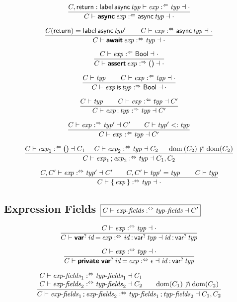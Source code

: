 $$
\frac{
  C, \K{return} : \K{label} \, \K{async} \x{typ} \vdash \x{exp} \anal \x{typ} \dashv \cdot
}{
  C \vdash \KK{async} \x{exp} \anal \K{async} \x{typ} \dashv \cdot
}
$$

$$
\frac{
  C(\K{return}) = \K{label} \, \K{async} \x{typ}'
  \qquad
  C \vdash \x{exp} \analsynth \K{async} \x{typ} \dashv \cdot
}{
  C \vdash \KK{await} \x{exp} \analsynth \x{typ} \dashv \cdot
}
$$

$$
\frac{
  C \vdash \x{exp} \anal \K{Bool} \dashv \cdot
}{
  C \vdash \KK{assert} \x{exp} \synth \K{()} \dashv \cdot
}
$$

$$
\frac{
  C \vdash \x{typ}
  \qquad
  C \vdash \x{exp} \anal \x{typ} \dashv \cdot
}{
  C \vdash \x{exp} \K{is} \x{typ} \synth \K{Bool} \dashv \cdot
}
$$

$$
\frac{
  C \vdash \x{typ}
  \qquad
  C \vdash \x{exp} \anal \x{typ} \dashv C'
}{
  C \vdash \x{exp} \K: \x{typ} \synth \x{typ} \dashv C'
}
$$

$$
\frac{
  C \vdash \x{exp} \synth \x{typ}' \dashv C'
  \qquad
  C \vdash \x{typ}' <: \x{typ}
}{
  C \vdash \x{exp} \anal \x{typ} \dashv C'
}
$$

$$
\frac{
  C \vdash \x{exp}_1 \anal \K{()} \dashv C_1
  \quad~
  C \vdash \x{exp}_2 \analsynth \x{typ} \dashv C_2
  \quad~
  \Dom(C_2) \setdisj \Dom(C_2)
}{
  C \vdash \x{exp}_1 \K; \x{exp}_2 \analsynth \x{typ} \dashv C_1, C_2
}
$$

$$
\frac{
  C, C' \vdash \x{exp} \analsynth \x{typ}' \dashv C'
  \qquad
  C, C' \vdash \x{typ}' = \x{typ}
  \qquad
  C \vdash \x{typ}
}{
  C \vdash \K\{ \x{exp} \K\} \analsynth \x{typ} \dashv \cdot
}
$$


\subsection*{Expression Fields \hfill $\boxed{C \vdash \x{exp-fields} \analsynth \x{typ-fields} \dashv C'}$}

$$
\frac{
  C \vdash \x{exp} \analsynth \x{typ} \dashv \cdot
}{
  C \vdash \KK{var}^? \x{id} \K= \x{exp} \analsynth \x{id} \K: \, \K{var}^? \x{typ} \dashv \x{id} \K: \, \K{var}^? \x{typ}
}
$$

$$
\frac{
  C \vdash \x{exp} \analsynth \x{typ} \dashv \cdot
}{
  C \vdash \KK{private} \; \KK{var}^? \x{id} \K= \x{exp} \analsynth \epsilon \dashv \x{id} \K: \, \K{var}^? \x{typ}
}
$$

$$
\frac{
  \begin{array}{@{}l@{\qquad}l@{}}
  C \vdash \x{exp-fields}_1 \analsynth \x{typ-fields}_1 \dashv C_1
  \\
  C \vdash \x{exp-fields}_2 \analsynth \x{typ-fields}_2 \dashv C_2
  &
  \Dom(C_1) \setdisj \Dom(C_2)
  \end{array}
}{
  C \vdash \x{exp-fields}_1 \K; \x{exp-fields}_2 \analsynth \x{typ-fields}_1 \K; \x{typ-fields}_2 \dashv C_1, C_2
}
$$


